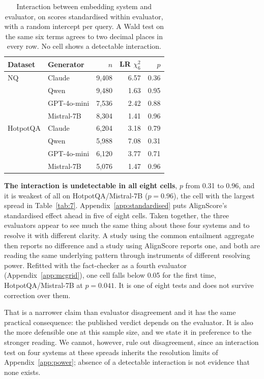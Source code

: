 \documentclass[11pt]{article}
\begin{document}
\begin{table}[t]
\centering\small
\begin{tabular}{llrrr}
\toprule
\textbf{Dataset} & \textbf{Generator} & $n$ & LR $\chi^2_6$ & $p$ \\
\midrule
NQ & Claude & 9,408 & 6.57 & 0.36 \\
 & Qwen & 9,480 & 1.63 & 0.95 \\
 & GPT-4o-mini & 7,536 & 2.42 & 0.88 \\
 & Mistral-7B & 8,304 & 1.41 & 0.96 \\
\midrule
HotpotQA & Claude & 6,204 & 3.18 & 0.79 \\
 & Qwen & 5,988 & 7.08 & 0.31 \\
 & GPT-4o-mini & 6,120 & 3.77 & 0.71 \\
 & Mistral-7B & 5,076 & 1.47 & 0.96 \\
\bottomrule
\end{tabular}
\caption{Interaction between embedding system and evaluator, on scores standardised within evaluator, with a random intercept per query. A Wald test on the same six terms agrees to two decimal places in every row. No cell shows a detectable interaction.}
\label{tab:interaction}
\end{table}

\textbf{The interaction is undetectable in all eight cells}, $p$ from 0.31 to 0.96, and it is weakest of all on HotpotQA/Mistral-7B ($p = 0.96$), the cell with the largest spread in Table~\ref{tab:7}. Appendix~\ref{app:standardised} puts AlignScore's standardised effect ahead in five of eight cells. Taken together, the three evaluators appear to see much the same thing about these four systems and to resolve it with different clarity. A study using the common entailment aggregate then reports no difference and a study using AlignScore reports one, and both are reading the same underlying pattern through instruments of different resolving power. Refitted with the fact-checker as a fourth evaluator (Appendix~\ref{app:mcgrid}), one cell falls below 0.05 for the first time, HotpotQA/Mistral-7B at $p = 0.041$. It is one of eight tests and does not survive correction over them.

That is a narrower claim than evaluator disagreement and it has the same practical consequence: the published verdict depends on the evaluator. It is also the more defensible one at this sample size, and we state it in preference to the stronger reading. We cannot, however, rule out disagreement, since an interaction test on four systems at these spreads inherits the resolution limits of Appendix~\ref{app:power}; absence of a detectable interaction is not evidence that none exists.
\end{document}
